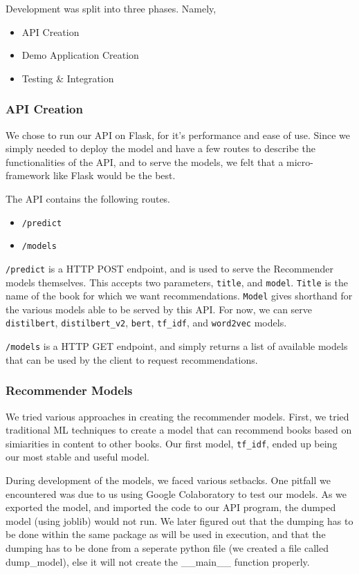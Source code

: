Development was split into three phases. Namely,
\begin{itemize}
    \item API Creation
    \item Demo Application Creation
    \item Testing \& Integration
\end{itemize}

\subsubsection{API Creation}
We chose to run our API on Flask, for it's performance and ease of use. Since
we simply needed to deploy the model and have a few routes to describe the
functionalities of the API, and to serve the models, we felt that a
micro-framework like Flask would be the best.

The API contains the following routes.
\begin{itemize}[label={}]
    \item \texttt{/predict}
    \item \texttt{/models}
\end{itemize}

\texttt{/predict} is a HTTP POST endpoint, and is used to serve the Recommender models themselves. This accepts two parameters, \texttt{title}, and \texttt{model}. \texttt{Title} is the name of the book for which we want recommendations. \texttt{Model} gives shorthand for the various models able to be served by this API. For now, we can serve \texttt{distilbert}, \texttt{distilbert\_v2}, \texttt{bert}, \texttt{tf\_idf}, and \texttt{word2vec} models.

\texttt{/models} is a HTTP GET endpoint, and simply returns a list of available models that can be used by the client to request recommendations.

\subsubsection*{Recommender Models}
We tried various approaches in creating the recommender models. First, we tried traditional ML techniques to create a model that can recommend books based on simiarities in content to other books. Our first model, \texttt{tf\_idf}, ended up being our most stable and useful model.

During development of the models, we faced various setbacks. One pitfall we encountered was due to us using Google Colaboratory to test our models. As we exported the model, and imported the code to our API program, the dumped model (using joblib) would not run. We later figured out that the dumping has to be done within the same package as will be used in execution, and that the dumping has to be done from a seperate python file (we created a file called dump\_model), else it will not create the \_\_main\_\_ function properly.

